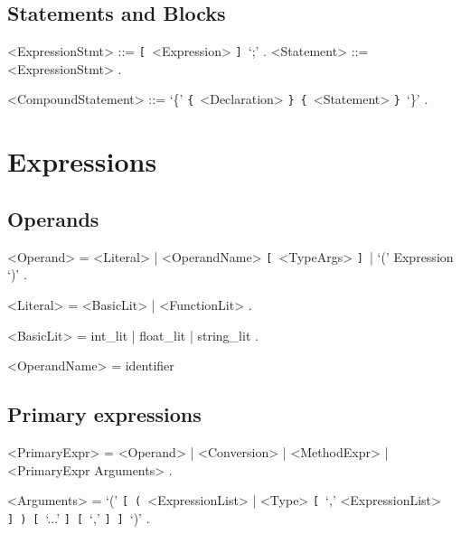 \documentclass{article}
\def\lrep{\synshortsoff\texttt{\{}\synshorts~}
\def\rrep{\synshortsoff\texttt{\}}\synshorts~}
\def\lopt{\synshortsoff\texttt{[}\synshorts~}
\def\ropt{\synshortsoff\texttt{]}\synshorts~}
\def\lgrp{\synshortsoff\texttt{(}\synshorts~}
\def\rgrp{\synshortsoff\texttt{)}\synshorts~}
\begin{document}
\subsection*{Statements and Blocks}

\begin{grammar}
  <ExpressionStmt> ::= \lopt <Expression> \ropt `;' .
  <Statement> ::= <ExpressionStmt> .
  
  <CompoundStatement> ::= `\{' \lrep <Declaration> \rrep \lrep <Statement>
  \rrep `\}' .
\end{grammar}

\section*{Expressions}

\subsection*{Operands}
\begin{grammar}
	<Operand> = <Literal> | <OperandName> \lopt <TypeArgs> \ropt | `(' Expression `)' .

	<Literal> = <BasicLit> | <FunctionLit> . %

	<BasicLit> = int_lit | float_lit | string_lit . %

	<OperandName> = identifier %
\end{grammar}


\subsection*{Primary expressions}
\begin{grammar}
	<PrimaryExpr> = <Operand> | <Conversion> | <MethodExpr> | <PrimaryExpr Arguments> .
	
	<Arguments> = `(' \lopt \lgrp <ExpressionList> | <Type> \lopt `,' <ExpressionList> \ropt \rgrp \lopt `...' \ropt \lopt `,' \ropt \ropt `)' .
	
\end{grammar}
\end{document}
